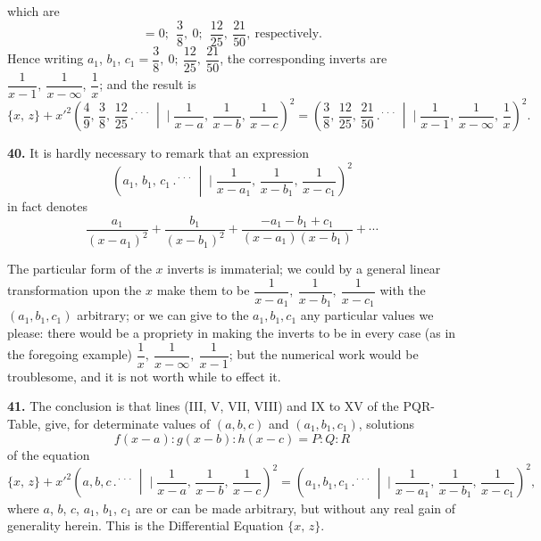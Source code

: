 \documentclass[11pt]{article}
\newcommand{\artno}[1]{\textbf{#1.}\quad}
\begin{document}
\newpage
which are
\[
   = 0;\ \ \frac{3}{8},\ 0;\ \ \frac{12}{25},\ \frac{21}{50},\ \text{respectively.}
\]
Hence writing $a_{1}$, $b_{1}$, $c_{1} = \dfrac{3}{8},\ 0;\ \dfrac{12}{25},\ \dfrac{21}{50}$, the corresponding inverts are $\dfrac{1}{x-1},\ \dfrac{1}{x-\infty}$,
$\dfrac{1}{x}$; and the result is
\[
   \{x,\,z\} + x'^{2}\!\left(\frac{4}{9},\,\frac{3}{8},\,\frac{12}{25} \,.{}^{\!\cdot\!\cdot\!\cdot}\,\middle|\!\!\!\mid \frac{1}{x-a},\,\frac{1}{x-b},\,\frac{1}{x-c}\right)^{\!2}
   = \left(\frac{3}{8},\,\frac{12}{25},\,\frac{21}{50} \,.{}^{\!\cdot\!\cdot\!\cdot}\,\middle|\!\!\!\mid \frac{1}{x-1},\,\frac{1}{x-\infty},\,\frac{1}{x}\right)^{\!2}.
\]

\artno{40} It is hardly necessary to remark that an expression
\[
   \left(a_{1},\,b_{1},\,c_{1} \,.{}^{\!\cdot\!\cdot\!\cdot}\,\middle|\!\!\!\mid \frac{1}{x-a_{1}},\,\frac{1}{x-b_{1}},\,\frac{1}{x-c_{1}}\right)^{\!2}
\]
in fact denotes
\[
   \frac{a_{1}}{(x-a_{1})^{2}} + \frac{b_{1}}{(x-b_{1})^{2}} + \frac{-a_{1}-b_{1}+c_{1}}{(x-a_{1})(x-b_{1})} + \cdots
\]

The particular form of the $x$ inverts is immaterial; we could by a general linear
transformation upon the $x$ make them to be $\dfrac{1}{x-a_{1}},\ \dfrac{1}{x-b_{1}},\ \dfrac{1}{x-c_{1}}$ with the $(a_{1}, b_{1}, c_{1})$
arbitrary; or we can give to the $a_{1}, b_{1}, c_{1}$ any particular values we please: there
would be a propriety in making the inverts to be in every case (as in the foregoing
example) $\dfrac{1}{x},\ \dfrac{1}{x-\infty},\ \dfrac{1}{x-1}$; but the numerical work would be troublesome, and it is
not worth while to effect it.

\artno{41} The conclusion is that lines (III, V, VII, VIII) and IX to XV of the
PQR-Table, give, for determinate values of $(a, b, c)$ and $(a_{1}, b_{1}, c_{1})$, solutions
\[
   f(x-a) : g(x-b) : h(x-c) = P : Q : R
\]
of the equation
\[
   \{x,\,z\} + x'^{2}\!\left(a, b, c \,.{}^{\!\cdot\!\cdot\!\cdot}\,\middle|\!\!\!\mid \frac{1}{x-a},\,\frac{1}{x-b},\,\frac{1}{x-c}\right)^{\!2}
   = \left(a_{1}, b_{1}, c_{1} \,.{}^{\!\cdot\!\cdot\!\cdot}\,\middle|\!\!\!\mid \frac{1}{x-a_{1}},\,\frac{1}{x-b_{1}},\,\frac{1}{x-c_{1}}\right)^{\!2},
\]
where $a$, $b$, $c$, $a_{1}$, $b_{1}$, $c_{1}$ are or can be made arbitrary, but without any real gain of
generality herein. This is the Differential Equation $\{x,\,z\}$.
\end{document}
